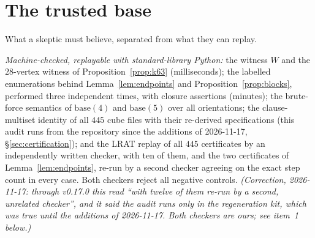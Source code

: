\documentclass[11pt]{amsart}
\theoremstyle{plain}
\theoremstyle{definition}
\theoremstyle{remark}
\begin{document}
\section{The trusted base}\label{sec:tcb}

What a skeptic must believe, separated from what they can replay.

\emph{Machine-checked, replayable with standard-library Python:} the
witness $W$ and the $28$-vertex witness of
Proposition~\ref{prop:k63} (milliseconds); the labelled enumerations
behind Lemma~\ref{lem:endpoints} and Proposition~\ref{prop:blocks},
performed three independent times, with closure assertions (minutes);
the brute-force semantics of $\mathrm{base}(4)$ and $\mathrm{base}(5)$
over all orientations; the clause-multiset identity of all $445$ cube
files with their re-derived specifications (this audit runs from the
repository since the additions of 2026-11-17,
\S\ref{sec:certification}); and the LRAT replay of all $445$
certificates by an independently written checker, with ten of them, and
the two certificates of Lemma~\ref{lem:endpoints}, re-run by a second
checker agreeing on the exact step count in every case. Both checkers
reject all negative controls. \emph{(Correction, 2026-11-17: through
v0.17.0 this read ``with twelve of them re-run by a second, unrelated
checker'', and it said the audit runs only in the regeneration kit, which
was true until the additions of 2026-11-17. Both checkers are ours; see
item~1 below.)}
\end{document}
